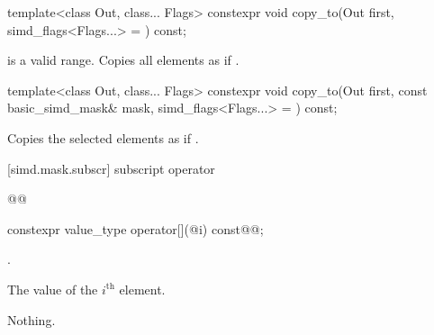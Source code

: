 \begin{itemdecl}
template<class Out, class... Flags>
  constexpr void copy_to(Out first, simd_flags<Flags...> = {}) const;
\end{itemdecl}

\begin{itemdescr}
  \MaskStoreDescr
    {\tcode{[first, first + size())} is a valid range.}
    {Copies all  elements as if  \foralli.}
\end{itemdescr}

\begin{itemdecl}
template<class Out, class... Flags>
  constexpr void copy_to(Out first, const basic_simd_mask& mask, simd_flags<Flags...> = {}) const;
\end{itemdecl}

\begin{itemdescr}
  \MaskStoreDescr
  {\validMaskedRange}
  {Copies the selected elements as if  \forallmaskedi.}
\end{itemdescr}

[simd.mask.subscr]{ subscript operator\texorpdfstring{}{s}}

\begin{wgBRem}
\begin{itemdecl}
@@
\end{itemdecl}

\begin{itemdescr}
  \pnum{}

  \pnum{}

  \pnum{}
\end{itemdescr}
\end{wgBRem}

\begin{itemdecl}
constexpr value_type operator[](@\simdsizetype@ i) const@\wgRem{\&}@;
\end{itemdecl}

\begin{itemdescr}
  \pnum\expects
  .

  \pnum\returns
  The value of the $i^\text{th}$ element.

  \pnum\throws Nothing.
\end{itemdescr}

